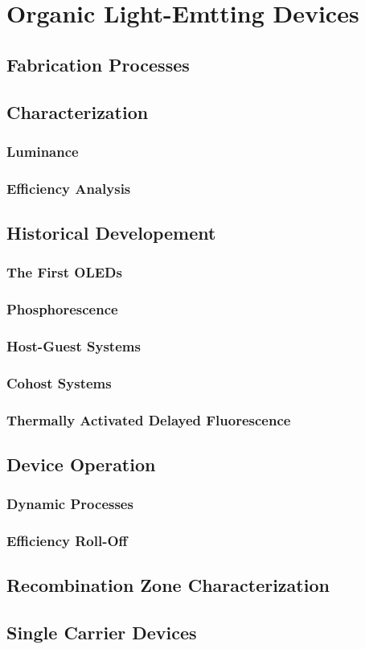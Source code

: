 \documentclass[../thesis.tex]{subfiles}
\begin{document}
\chapter{Organic Light-Emtting Devices}\label{sec:oleds}

\section{Fabrication Processes}

\section{Characterization}
\subsection{Luminance}
\subsection{Efficiency Analysis}

\section{Historical Developement}
\subsection{The First OLEDs}
\subsection{Phosphorescence}
\subsection{Host-Guest Systems}
\subsection{Cohost Systems}
\subsection{Thermally Activated Delayed Fluorescence}

\section{Device Operation}
\subsection{Dynamic Processes}
\subsection{Efficiency Roll-Off}

\section{Recombination Zone Characterization}

\section{Single Carrier Devices}



\end{document}

